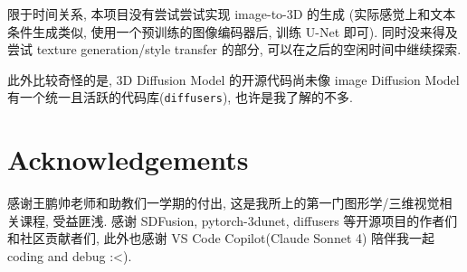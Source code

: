 \documentclass[11pt]{article}
\newcommand\1{\mathds{1}}
\begin{document}
限于时间关系, 本项目没有尝试尝试实现 image-to-3D 的生成 (实际感觉上和文本条件生成类似, 使用一个预训练的图像编码器后, 训练 U-Net 即可). 同时没来得及尝试 texture generation/style transfer 的部分, 可以在之后的空闲时间中继续探索.

此外比较奇怪的是, 3D Diffusion Model 的开源代码尚未像 image Diffusion Model 有一个统一且活跃的代码库(\texttt{diffusers}), 也许是我了解的不多.

\section*{Acknowledgements}
感谢王鹏帅老师和助教们一学期的付出, 这是我所上的第一门图形学/三维视觉相关课程, 受益匪浅. 
感谢 SDFusion, pytorch-3dunet, diffusers 等开源项目的作者们和社区贡献者们, 
此外也感谢 VS Code Copilot(Claude Sonnet 4) 陪伴我一起 coding and debug :<). 

 
 
\end{document}
